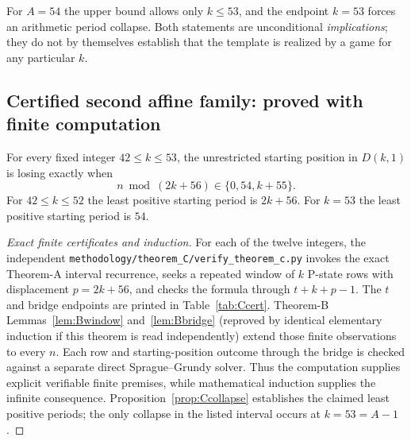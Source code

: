 For $A=54$ the upper bound allows only $k\le53$, and the endpoint $k=53$ forces an arithmetic period collapse. Both statements are unconditional \emph{implications}; they do not by themselves establish that the template is realized by a game for any particular $k$.

\subsection{Certified second affine family: proved with finite computation}
\begin{theorem}\label{thm:Cfinite}
For every fixed integer $42\le k\le53$, the unrestricted starting position in $D(k,1)$ is losing exactly when
\[\boxed{n\bmod(2k+56)\in\{0,54,k+55\}.}\]
For $42\le k\le52$ the least positive starting period is $2k+56$. For $k=53$ the least positive starting period is $54$.
\end{theorem}
\begin{proof}[Exact finite certificates and induction]
For each of the twelve integers, the independent \texttt{methodology/theorem\_C/verify\_theorem\_c.py} invokes the exact Theorem-A interval recurrence, seeks a repeated window of $k$ P-state rows with displacement $p=2k+56$, and checks the formula through $t+k+p-1$. The $t$ and bridge endpoints are printed in Table~\ref{tab:Ccert}. Theorem-B Lemmas~\ref{lem:Bwindow} and~\ref{lem:Bbridge} (reproved by identical elementary induction if this theorem is read independently) extend those finite observations to every $n$. Each row and starting-position outcome through the bridge is checked against a separate direct Sprague--Grundy solver. Thus the computation supplies explicit verifiable finite premises, while mathematical induction supplies the infinite consequence. Proposition~\ref{prop:Ccollapse} establishes the claimed least positive periods; the only collapse in the listed interval occurs at $k=53=A-1$.
\end{proof}
